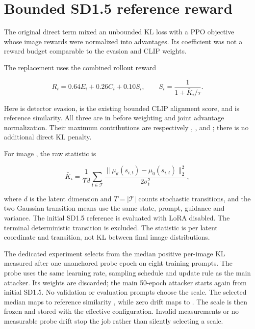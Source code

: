 \section{Bounded SD1.5 reference
reward}\label{record-docs-image-reference-reward-md-bounded-sd1.5-reference-reward}

The original direct term mixed an unbounded KL loss with a PPO objective
whose image rewards were normalized into advantages. Its coefficient was
not a reward budget comparable to the evasion and CLIP weights.

The replacement uses the combined rollout reward

\[
R_i = 0.64 E_i + 0.26 C_i + 0.10 S_i,
\qquad S_i = \frac{1}{1 + \bar K_i / \tau}.
\]

Here \texttt{} is detector evasion, \texttt{} is
the existing bounded CLIP alignment score, and \texttt{} is
reference similarity. All three are in \texttt{\seqsplit{[0, 1]}} before
weighting and joint advantage normalization. Their maximum contributions
are respectively \texttt{}, \texttt{}, and
\texttt{}; there is no additional direct KL penalty.

For image \texttt{}, the raw statistic is

\[
\bar K_i = \frac{1}{T d}\sum_{t\in\mathcal T}
\frac{\|\mu_\theta(s_{i,t})-\mu_0(s_{i,t})\|_2^2}{2\sigma_t^2},
\]

where \(d\) is the latent dimension and \(T=|\mathcal T|\) counts
stochastic transitions, and the two Gaussian transition means use the
same state, prompt, guidance and variance. The initial SD1.5 reference
is evaluated with LoRA disabled. The terminal deterministic transition
is excluded. The statistic is per latent coordinate and transition, not
KL between final image distributions.

The dedicated experiment selects \texttt{} from the median
positive per-image KL measured after one unanchored probe epoch on eight
training prompts. The probe uses the same learning rate, sampling
schedule and update rule as the main attacker. Its weights are
discarded; the main 50-epoch attacker starts again from initial SD1.5.
No validation or evaluation prompts choose the scale. The selected
median maps to reference similarity \texttt{}, while zero
drift maps to \texttt{}. The scale is then frozen and stored
with the effective configuration. Invalid measurements or no measurable
probe drift stop the job rather than silently selecting a scale.


